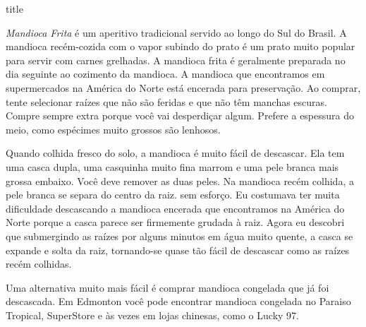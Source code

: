 \documentclass [11pt, letterpaper] {article}
\begin{document}
 {title}

{\em Mandioca Frita} é um aperitivo tradicional servido ao longo do
Sul do Brasil. A mandioca recém-cozida com o vapor subindo
do prato é um prato muito popular para servir com carnes grelhadas.
A mandioca frita \'e geralmente preparada no dia seguinte ao cozimento da mandioca. A mandioca que encontramos em supermercados na Am\'erica do Norte
está encerada para preservação. Ao comprar, tente selecionar raízes
que não são feridas e que não têm manchas escuras. Compre sempre extra
porque você vai desperdiçar algum. Prefere a espessura do meio, como
espécimes muito grossos são lenhosos.

Quando colhida fresco do solo, a mandioca é muito fácil de descascar. Ela
tem uma casca dupla, uma casquinha muito fina marrom e uma pele branca mais grossa
embaixo. Você deve remover as duas peles. Na
mandioca rec\'em colhida, a pele branca se separa do centro da raiz.
sem esforço. Eu costumava ter muita dificuldade descascando a
mandioca encerada que encontramos na América do Norte porque a casca parece ser
firmemente grudada \`a raiz. Agora eu descobri que submergindo as raízes
por alguns minutos em água muito quente, a casca se expande e solta
da raiz, tornando-se quase tão fácil de descascar como as ra\'izes rec\'em
colhidas.

Uma alternativa muito mais fácil é comprar mandioca congelada que já foi descascada. Em Edmonton você pode encontrar mandioca congelada no Paraiso Tropical, SuperStore e às vezes em lojas chinesas, como o Lucky 97.
\end{document}
